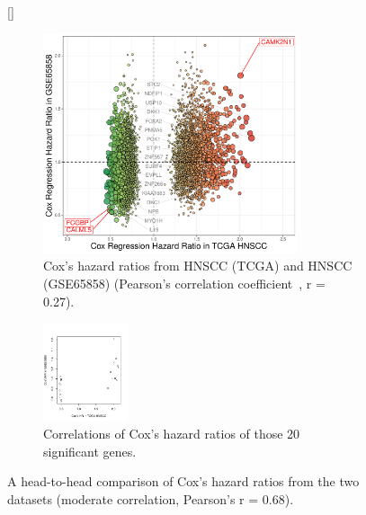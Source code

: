 \documentclass[
paper=landscape,
paper=160mm:90mm, %
fontsize=11pt, %
pagesize, %
parskip=half-, %
]{scrartcl} %
\theoremstyle{mythmstyle} %
\begin{document}
\begin{figure}[ht]

[\FBwidth]
{%
    
    \begin{subfigure}[c]{0.5\textwidth}
    \includegraphics[width=7.5cm]{RplotH2H_TCGA_GSE65858_CoxHR.pdf}
    \caption{Cox's hazard ratios from HNSCC (TCGA) and HNSCC (GSE65858) (Pearson's correlation coefficient~\cite{Schober2018}, r = 0.27).}
    \end{subfigure}
    \begin{subfigure}[t]{0.15\textwidth}
    \includegraphics[width=2.5cm]{Rplot20_correlation_TCGA_GSE65858_CoxHR.pdf}
    \caption{Correlations of Cox's hazard ratios of those 20 significant genes.}%
    \end{subfigure}    
}   
{\captionsetup{labelformat=empty}    \caption{A head-to-head comparison of Cox's hazard ratios from the two datasets (moderate correlation, Pearson's r = 0.68).
    }}
\end{figure}
\end{document}
